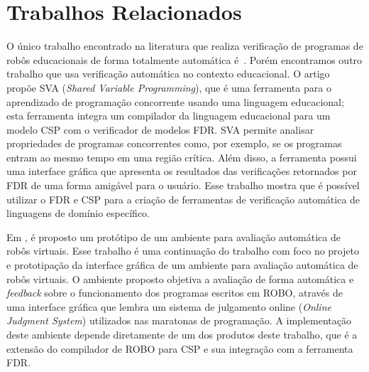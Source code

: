 
\section{Trabalhos Relacionados}

O único trabalho encontrado na literatura que realiza verificação de programas de robôs educacionais de forma totalmente automática é~\cite{nogueira}. Porém encontramos outro trabalho que usa verificação automática no contexto educacional. O artigo~\cite{SVA} propõe SVA (\textit{Shared Variable Programming}), que é uma ferramenta para o aprendizado de programação concorrente usando uma linguagem educacional; esta ferramenta integra um compilador da linguagem educacional para um modelo CSP com o verificador de modelos FDR. SVA permite analisar propriedades de programas concorrentes como, por exemplo, se os programas entram ao mesmo tempo em uma região crítica. Além disso, a ferramenta possui uma interface gráfica que apresenta os resultados das verificações retornados por FDR de uma forma amigável para o usuário. Esse trabalho mostra que é possível utilizar o FDR e CSP para a criação de ferramentas de verificação automática de linguagens de domínio específico. 

Em \cite{emanuel2017}, é proposto um protótipo de um ambiente para avaliação automática de robôs virtuais. Esse trabalho é uma continuação do trabalho \cite{nogueira} com foco no projeto e prototipação da interface gráfica de um ambiente para avaliação automática de robôs virtuais. O ambiente proposto objetiva a avaliação de forma automática e \textit{feedback} sobre o funcionamento dos programas escritos em ROBO, através de uma interface gráfica que lembra um sistema de julgamento online (\textit{Online Judgment System}) utilizados nas maratonas de programação. A implementação deste ambiente depende diretamente de um dos produtos deste trabalho, que é a extensão do compilador de ROBO para CSP e sua integração com a ferramenta FDR. 

